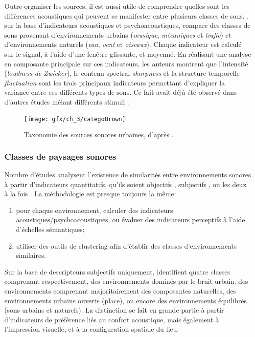 Outre organiser les sources, il est aussi utile de comprendre quelles sont les différences acoustiques qui peuvent se manifester entre plusieurs classes de sons. \citep{yang2013psychoacoustical}, sur la base d'indicateurs acoustiques et psychoacoustiques, compare des classes de sons provenant d'environnements urbains (\emph{musique}, \emph{mécaniques} et \emph{trafic}) et d'environnements naturels (\emph{eau}, \emph{vent} et \emph{oiseaux}). Chaque indicateur est calculé sur le signal, à l'aide d'une fenêtre glissante, et moyenné. En réalisant une analyse en composante principale sur ces indicateurs, les auteurs montrent que l'intensité (\emph{loudness  de Zwicker}), le contenu spectral \emph{sharpness} et la structure temporelle \emph{fluctuation} sont les trois principaux indicateurs permettant d'expliquer la variance entre ces différents types de sons. Ce fait avait déjà été observé dans d'autres études mêlant différents stimuli \citep{de2006quiet,botteldooren2006temporal}.


\begin{figure}[t]
        \myfloatalign
        \texttt{[image: gfx/ch\_3/categoBrown]}
        \caption[Taxonomie des sources sonores urbaines.]{Taxonomie des sources sonores urbaines, d'après \citep{brown2011towards}.}\label{fig:catSoundscapeBrown}
\end{figure}

\subsubsection{Classes de paysages sonores}
\label{sec:ch3_classePaysage}

Nombre d'études analysent l'existence de similarités entre environnements sonores à partir d'indicateurs quantitatifs, qu'ils soient objectifs \citep{rychtarikova2013soundscape}, subjectifs \citep{jeon2013soundwalk}, ou les deux à la fois \citep{torija2013application,ricciardi2015sound}. La méthodologie est presque toujours la même:

\begin{enumerate}
\item pour chaque environnement, calculer des indicateurs acoustiques/psychoacoustiques, ou évaluer des indicateurs perceptifs à l'aide d'échelles sémantiques;
\item utiliser des outils de clustering afin d'établir des classes d'environnements similaires.
\end{enumerate}

Sur la base de descripteurs subjectifs uniquement, \citep{jeon2013soundwalk} identifient quatre classes comprenant respectivement, des environnements dominés par le bruit urbain, des environnements comprenant majoritairement des composantes naturelles, des environnements urbains ouverts (place), ou encore des environnements équilibrés (sons urbains et naturels). La distinction se fait en grande partie à partir d'indicateurs de préférence liés au confort acoustique, mais également à l'impression visuelle, et à la configuration spatiale du lieu.  

